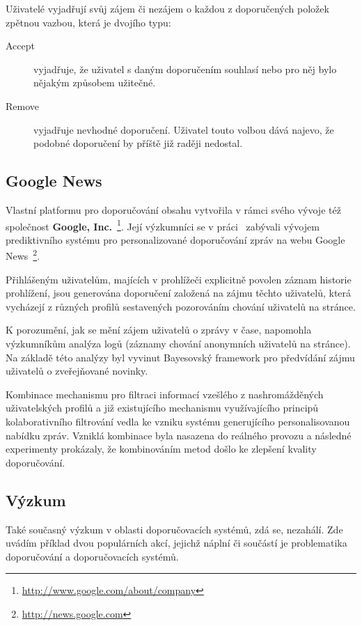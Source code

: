 \documentclass[thesis=M,czech]{FITthesis}[2014/05/07]
\begin{document}
Uživatelé vyjadřují svůj zájem či nezájem o každou z doporučených položek zpětnou vazbou, která je dvojího typu:

\begin{description}
	\item[Accept] vyjadřuje, že uživatel s daným doporučením souhlasí nebo pro něj bylo nějakým způsobem užitečné.
	\item[Remove] vyjadřuje nevhodné doporučení. Uživatel touto volbou dává najevo, že podobné doporučení by příště již raději nedostal.
\end{description}

\subsection{Google News}	

Vlastní platformu pro doporučování obsahu vytvořila v rámci svého vývoje též společnost \textbf{Google, Inc.}~\footnote{\url{http://www.google.com/about/company}}. Její výzkumníci se v práci~\cite{googlenews} zabývali vývojem prediktivního systému pro personalizované doporučování zpráv na webu Google News~\footnote{\url{http://news.google.com}}.

Přihlášeným uživatelům, majících v prohlížeči explicitně povolen záznam historie prohlížení, jsou generována doporučení založená na zájmu těchto uživatelů, která vycházejí z různých profilů sestavených pozorováním chování uživatelů na stránce.  

K porozumění, jak se mění zájem uživatelů o zprávy v čase, napomohla výzkumníkům analýza logů (záznamy chování anonymních uživatelů na stránce). Na základě této analýzy byl vyvinut Bayesovský framework pro předvídání zájmu uživatelů o zveřejňované novinky.

Kombinace mechanismu pro filtraci informací vzešlého z nashromážděných uživatelských profilů a již existujícího mechanismu využívajícího principů kolaborativního filtrování vedla ke vzniku systému generujícího personalisovanou nabídku zpráv. Vzniklá kombinace byla nasazena do reálného provozu a následné experimenty prokázaly, že kombinováním metod došlo ke zlepšení kvality doporučování.

\subsection{Výzkum}

Také současný výzkum v oblasti doporučovacích systémů, zdá se, nezahálí. Zde uvádím příklad dvou populárních akcí, jejichž náplní či součástí je problematika doporučování a doporučovacích systémů.
\end{document}
